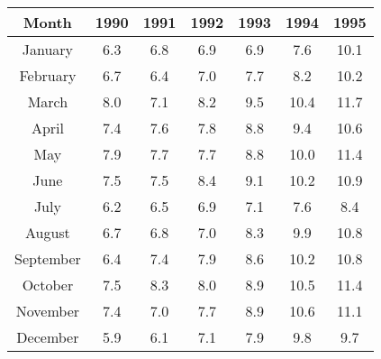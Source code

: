 \documentclass[12pt, english]{article}
\numberwithin{equation}{section} %
\theoremstyle{plain}
\theoremstyle{definition}
\begin{document}
\begin{center}
	\begin{tabular}{|c|c|c|c|c|c|c|}
		\hline\hline
		Month & 1990 & 1991 & 1992 & 1993 & 1994 & 1995 \\
		\hline\hline
		January & 6.3 & 6.8 & 6.9 & 6.9 & 7.6 & 10.1 \\
		February & 6.7 & 6.4 & 7.0 & 7.7 & 8.2 & 10.2 \\
		March & 8.0 & 7.1 & 8.2 & 9.5 & 10.4 & 11.7 \\
		April & 7.4 & 7.6 & 7.8 & 8.8 & 9.4 & 10.6 \\
		May & 7.9 & 7.7 & 7.7 & 8.8 & 10.0 & 11.4 \\
		June & 7.5 & 7.5 & 8.4 & 9.1 & 10.2 & 10.9 \\
		July & 6.2 & 6.5 & 6.9 & 7.1 & 7.6 & 8.4 \\
		August & 6.7 & 6.8 & 7.0 & 8.3 & 9.9 & 10.8 \\
		September & 6.4 & 7.4 & 7.9 & 8.6 & 10.2 & 10.8 \\
		October & 7.5 & 8.3 & 8.0 & 8.9 & 10.5 & 11.4 \\
		November & 7.4 & 7.0 & 7.7 & 8.9 & 10.6 & 11.1 \\
		December & 5.9 & 6.1 & 7.1 & 7.9 & 9.8 & 9.7 \\
		\hline\hline
	\end{tabular}
\end{center}
\end{document}
